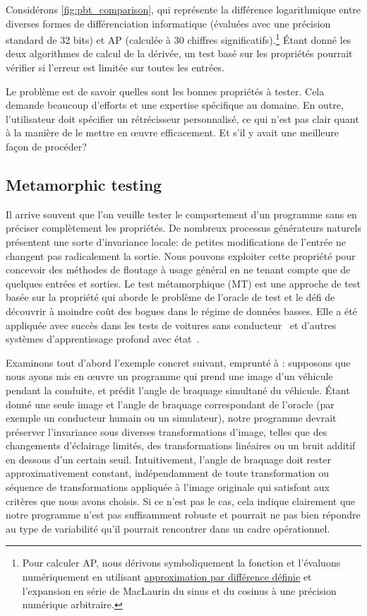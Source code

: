 %
Considérons \autoref{fig:pbt_comparison}, qui représente la différence logarithmique entre diverses formes de différenciation informatique (évaluées avec une précision standard de 32 bits) et AP (calculée à 30 chiffres significatifs).\hspace{-.08em}\footnote{Pour calculer AP, nous dérivons symboliquement la fonction et l'évaluons numériquement en utilisant \hyperref[sec:fdm]{approximation par différence définie} et l'expansion en série de MacLaurin du sinus et du cosinus à une précision numérique arbitraire.} Étant donné les deux algorithmes de calcul de la dérivée, un test basé sur les propriétés pourrait vérifier si l'erreur est limitée sur toutes les entrées.

Le problème est de savoir quelles sont les bonnes propriétés à tester. Cela demande beaucoup d'efforts et une expertise spécifique au domaine. En outre, l'utilisateur doit spécifier un rétrécisseur personnalisé, ce qui n'est pas clair quant à la manière de le mettre en œuvre efficacement. Et s'il y avait une meilleure façon de procéder?

\subsection{Metamorphic testing}\label{subsec:metamorphic-testing}

Il arrive souvent que l'on veuille tester le comportement d'un programme sans en préciser complètement les propriétés. De nombreux processus générateurs naturels présentent une sorte d'invariance locale: de petites modifications de l'entrée ne changent pas radicalement la sortie. Nous pouvons exploiter cette propriété pour concevoir des méthodes de floutage à usage général en ne tenant compte que de quelques entrées et sorties. Le test métamorphique (MT) est une approche de test basée sur la propriété qui aborde le problème de l'oracle de test et le défi de découvrir à moindre coût des bogues dans le régime de données basses. Elle a été appliquée avec succès dans les tests de voitures sans conducteur~\citep{zhou2019metamorphic, pei2017deepxplore, tian2018deeptest} et d'autres systèmes d'apprentissage profond avec état~\citep{du2018deepcruiser}.

Examinons tout d'abord l'exemple concret suivant, emprunté à \citet{tian2018deepcruiser}: supposons que nous ayons mis en œuvre un programme qui prend une image d'un véhicule pendant la conduite, et prédit l'angle de braquage simultané du véhicule. Étant donné une seule image et l'angle de braquage correspondant de l'oracle (par exemple un conducteur humain ou un simulateur), notre programme devrait préserver l'invariance sous diverses transformations d'image, telles que des changements d'éclairage limités, des transformations linéaires ou un bruit additif en dessous d'un certain seuil. Intuitivement, l'angle de braquage doit rester approximativement constant, indépendamment de toute transformation ou séquence de transformations appliquée à l'image originale qui satisfont aux critères que nous avons choisis. Si ce n'est pas le cas, cela indique clairement que notre programme n'est pas suffisamment robuste et pourrait ne pas bien répondre au type de variabilité qu'il pourrait rencontrer dans un cadre opérationnel.

